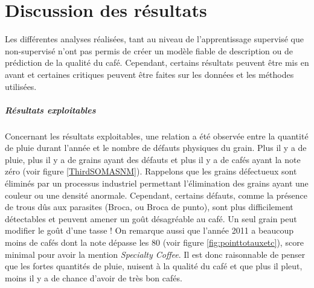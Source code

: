 \chapter{Discussion des résultats}








Les différentes analyses réalisées, tant au niveau de l'apprentissage supervisé que non-supervisé n'ont pas permis de créer un modèle fiable de description ou de prédiction de la qualité du café. Cependant, certains résultats peuvent être mis en avant et certaines critiques peuvent être faites sur les données et les méthodes utilisées. \\

\paragraph{Résultats exploitables} Concernant les résultats exploitables, une relation a été observée entre la quantité de pluie durant l'année et le nombre de défauts physiques du grain. Plus il y a de pluie, plus il y a de grains ayant des défauts et plus il y a de cafés ayant la note zéro (voir figure \ref{ThirdSOMASNM}). Rappelons que les grains défectueux sont éliminés par un processus industriel permettant l'élimination des grains ayant une couleur ou une densité anormale. Cependant, certains défauts, comme la présence de trous dûs aux parasites (Broca, ou Broca de punto), sont plus difficilement détectables et peuvent amener un goût désagréable au café. Un seul grain peut modifier le goût d'une tasse ! On remarque aussi que l'année 2011 a beaucoup moins de cafés dont la note dépasse les 80 (voir figure \ref{fig:pointtotauxetc}), score minimal pour avoir la mention \textit{Specialty Coffee}. Il est donc raisonnable de penser que les fortes quantités de pluie, nuisent à la qualité du café et que plus il pleut, moins il y a de chance d'avoir de très bon cafés.  \\



